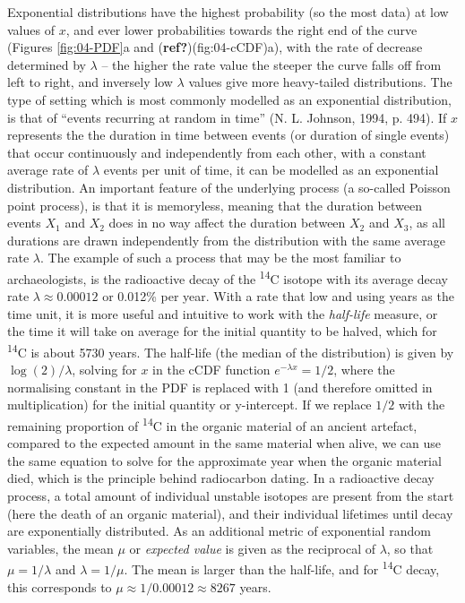 \documentclass[
  12pt,
]{book}
\begin{document}
Exponential distributions have the highest probability (so the most data) at low values of \(x\), and ever lower probabilities towards the right end of the curve (Figures \ref{fig:04-PDF}a and (\textbf{ref?})(fig:04-cCDF)a), with the rate of decrease determined by \(\lambda\) -- the higher the rate value the steeper the curve falls off from left to right, and inversely low \(\lambda\) values give more heavy-tailed distributions. The type of setting which is most commonly modelled as an exponential distribution, is that of ``events recurring at random in time'' (N. L. Johnson, 1994, p. 494). If \(x\) represents the the duration in time between events (or duration of single events) that occur continuously and independently from each other, with a constant average rate of \(\lambda\) events per unit of time, it can be modelled as an exponential distribution. An important feature of the underlying process (a so-called Poisson point process), is that it is memoryless, meaning that the duration between events \(X_1\) and \(X_2\) does in no way affect the duration between \(X_2\) and \(X_3\), as all durations are drawn independently from the distribution with the same average rate \(\lambda\). The example of such a process that may be the most familiar to archaeologists, is the radioactive decay of the \textsuperscript{14}C isotope with its average decay rate \(\lambda \approx 0.00012\) or 0.012\% per year. With a rate that low and using years as the time unit, it is more useful and intuitive to work with the \emph{half-life} measure, or the time it will take on average for the initial quantity to be halved, which for \textsuperscript{14}C is about 5730 years. The half-life (the median of the distribution) is given by \(\log (2)/\lambda\), solving for \(x\) in the cCDF function \(e^{-\lambda x} = 1/2\), where the normalising constant in the PDF is replaced with 1 (and therefore omitted in multiplication) for the initial quantity or y-intercept. If we replace \(1/2\) with the remaining proportion of \textsuperscript{14}C in the organic material of an ancient artefact, compared to the expected amount in the same material when alive, we can use the same equation to solve for the approximate year when the organic material died, which is the principle behind radiocarbon dating. In a radioactive decay process, a total amount of individual unstable isotopes are present from the start (here the death of an organic material), and their individual lifetimes until decay are exponentially distributed. As an additional metric of exponential random variables, the mean \(\mu\) or \emph{expected value} is given as the reciprocal of \(\lambda\), so that \(\mu = 1/\lambda\) and \(\lambda = 1/\mu\). The mean is larger than the half-life, and for \textsuperscript{14}C decay, this corresponds to \(\mu \approx 1/0.00012 \approx 8267\) years.
\end{document}
